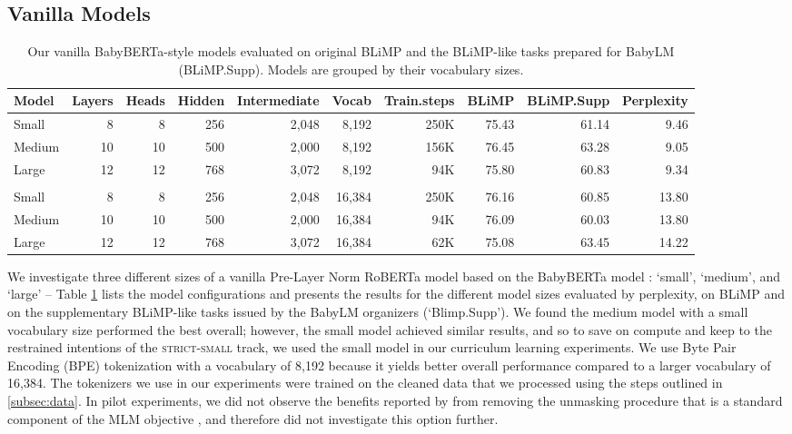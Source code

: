 \subsection{Vanilla Models}
\label{subsec:baseline}

\begin{table}
\centering
\small
\begin{tabular}{l | rrrrr | rrrr}
\toprule
Model  & Layers & Heads & Hidden & Intermediate & Vocab & Train.steps & BLiMP & BLiMP.Supp & Perplexity \\
\midrule
Small  & 8 & 8 & 256 & 2,048   & 8,192   & 250K      & 75.43      & 61.14       & 9.46    \\

Medium & 10 & 10 & 500 & 2,000 & 8,192  & 156K      & 76.45      & 63.28        & 9.05  \\
Large  & 12 & 12 & 768 & 3,072 & 8,192   & 94K      & 75.80      & 60.83      & 9.34 \\[2mm]
\hline \\
Small  & 8 & 8 & 256 & 2,048   & 16,384  & 250K      & 76.16      & 60.85       & 13.80    \\
Medium & 10 & 10 & 500 & 2,000  & 16,384 & 94K      & 76.09      & 60.03        & 13.80     \\
Large  & 12 & 12 & 768 & 3,072 & 16,384  & 62K      & 75.08      & 63.45      & 14.22     \\
\bottomrule
\end{tabular}
\caption{\label{tbl:baseline-size-comparison} Our vanilla BabyBERTa-style models evaluated on original BLiMP and the BLiMP-like tasks prepared for BabyLM (BLiMP.Supp). Models are grouped by their vocabulary sizes.}
\end{table}


We investigate three different sizes of a vanilla Pre-Layer Norm RoBERTa model \cite{liu2019roberta} based on the BabyBERTa model \cite{huebner2021babyberta}: `small', `medium', and `large' -- Table \ref{tbl:baseline-size-comparison} lists the model configurations and presents the results for the different model sizes evaluated by perplexity, on BLiMP \cite{warstadt2020blimp} and on the supplementary BLiMP-like tasks issued by the BabyLM organizers (`Blimp.Supp'). We found the medium model with a small vocabulary size performed the best overall; however, the small model achieved similar results, and so to save on compute and keep to the restrained intentions of the \textsc{strict-small} track, we used the small model in our curriculum learning experiments.
We use Byte Pair Encoding (BPE) tokenization \cite{gage1994bpe} with a vocabulary of 8,192 because it yields better overall performance compared to a larger vocabulary of 16,384. The tokenizers we use in our experiments were trained on the cleaned data that we processed using the steps outlined in \ref{subsec:data}. In pilot experiments, we did not observe the benefits reported by \citet{huebner2021babyberta} from removing the unmasking procedure that is a standard component of the MLM objective \cite{devlin2019bert}, and therefore did not investigate this option further.

